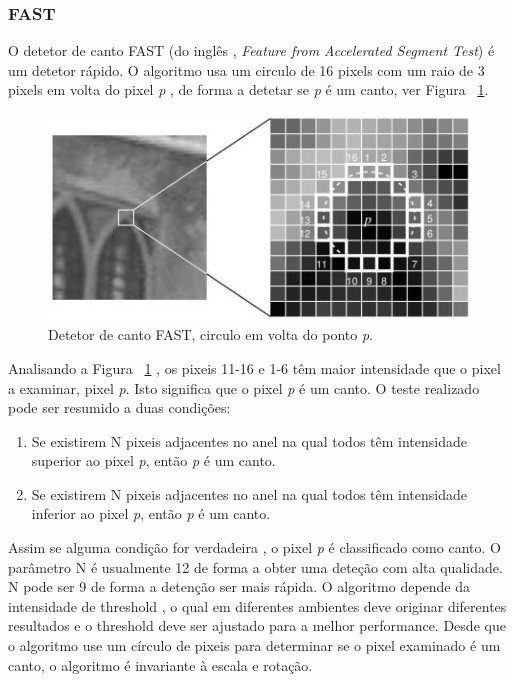 \subsubsection{FAST}\label{fastsection}

O detetor de canto FAST (do inglês ,\textit{ Feature from Accelerated Segment Test}) é um detetor rápido. O algoritmo usa um circulo de 16 pixels com um raio de 3 pixels em volta do pixel \textit{p} , de forma a detetar se \textit{p} é um canto, ver Figura ~\ref{fig:fastcornerdetector}.

\begin{figure}[h!]
	\centering
	\includegraphics[width=0.7\linewidth]{figures/FASTcornerdetector}
	\caption{Detetor de canto FAST, circulo em volta do ponto \textit{p}. \cite{VisualOdometryRodasVehicles}}
	\label{fig:fastcornerdetector}
\end{figure}

Analisando a Figura  ~\ref{fig:fastcornerdetector} , os pixeis 11-16 e 1-6 têm maior intensidade que o pixel a examinar, pixel \textit{p}. Isto significa que o pixel \textit{p} é um canto. O teste realizado pode ser resumido a duas condições:
\begin{enumerate}
	\item Se existirem N pixeis adjacentes no anel na qual todos têm intensidade superior ao pixel \textit{p}, então \textit{p} é um canto.
	\item Se existirem N pixeis adjacentes no anel na qual todos têm intensidade inferior ao pixel \textit{p}, então \textit{p} é um canto.	
\end{enumerate}
Assim se alguma condição for verdadeira , o pixel \textit{p} é classificado como canto. O parâmetro N é usualmente 12 de forma a obter uma deteção com alta qualidade. N pode ser 9 de forma a detenção ser mais rápida. 
O algoritmo depende da intensidade de threshold , o qual em diferentes ambientes deve originar diferentes resultados e o threshold deve ser ajustado para a melhor performance. Desde que o algoritmo use um círculo de pixeis para determinar se o pixel examinado é um canto, o algoritmo é invariante à escala e rotação.


